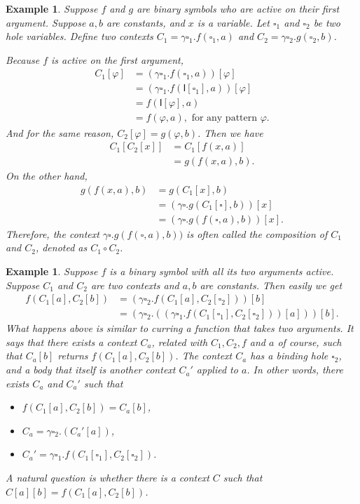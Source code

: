 \documentclass{article}
\theoremstyle{plain}
\newtheorem{eg}[thm]{Example}
\def\I{\textsf{I}}
\begin{document}
\begin{eg}
	Suppose $f$ and $g$ are binary symbols who are active on their first argument. Suppose $a, b$ are constants, and $x$ is a variable. Let $\square_1$ and $\square_2$ be two hole variables. Define two contexts $C_1 = \gamma \square_1 . f(\square_1, a)$ and $C_2 = \gamma \square_2 . g(\square_2, b)$. 
	
	Because $f$ is active on the first argument, 
	\begin{align*}
       C_1[\varphi]
       &= (\gamma \square_1 . f(\square_1, a)) [\varphi] \\
       &= (\gamma \square_1 . f(\I[\square_1], a)) [\varphi] \\
       &= f(\I[\varphi], a) \\
       &= f(\varphi, a), \text{ for any pattern $\varphi$.}
	\end{align*}
	And for the same reason, $C_2[\varphi] = g(\varphi, b)$. Then we have
	\begin{align*}
	C_1[C_2[x]]
	&= C_1[f(x,a)] \\
	&= g(f(x,a), b).
	\end{align*}
	On the other hand, 
	\begin{align*}
    g(f(x,a), b)
    &= g(C_1[x], b) \\
    &= (\gamma \square . g(C_1[\square], b))[x] \\
    &= (\gamma \square . g(f(\square, a), b))[x].
	\end{align*}
	Therefore, the context $\gamma \square . g(f(\square, a), b))$ is often called the \emph{composition} of $C_1$ and $C_2$, denoted as $C_1 \circ C_2$.

\end{eg}

\begin{eg}
	Suppose $f$ is a binary symbol with all its two arguments active. Suppose $C_1$ and $C_2$ are two contexts and $a, b$ are constants. Then easily we get
	\begin{align*}
	f(C_1[a],C_2[b])
	&= (\gamma \square_2 . f(C_1[a], C_2[\square_2]))[b] \\
	&= (\gamma \square_2 . ((\gamma \square_1 . f(C_1[\square_1], C_2[\square_2])) [a] )) [b].
	\end{align*}
	What happens above is similar to \emph{curring} a function that takes two arguments. It says that there exists a context $C_a$, related with $C_1, C_2, f$ and $a$ of course, such that $C_a[b]$ returns $f(C_1[a],C_2[b])$. The context $C_a$ has a binding hole $\square_2$, and a body that itself is another context $C_a'$ applied to $a$. In other words, there exists $C_a$ and $C_a'$ such that 
	\begin{itemize}
	\item $f(C_1[a],C_2[b]) = C_a[b]$,
	\item $C_a = \gamma \square_2 . (C_a'[a])$,
	\item $C_a' = \gamma \square_1 . f(C_1[\square_1], C_2[\square_2])$.
	\end{itemize}
	
	A natural question is whether there is a context $C$ such that $C[a][b] = f(C_1[a],C_2[b])$. 
\end{eg}
\end{document}

